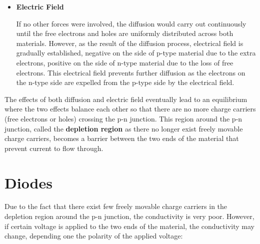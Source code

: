 \begin{itemize}
\begin{itemize}
\item {\bf Electric Field}

If no other forces were involved, the diffusion would carry out 
continuously until the free electrons and holes are uniformly distributed
across both materials. However, as the result of the diffusion process,
electrical field is gradually established, negative on the side of p-type 
material due to the extra electrons, positive on the side of n-type 
material due to the loss of free electrons. This electrical field prevents
further diffusion as the electrons on the n-type side are expelled from
the p-type side by the electrical field.

\end{itemize}

The effects of both diffusion and electric field eventually lead to an 
equilibrium where the two effects balance each other so that there are
no more charge carriers (free electrons or holes) crossing the p-n junction.
This region around the p-n junction, called the {\bf depletion region} as 
there no longer exist freely movable charge carriers, becomes a barrier 
between the two ends of the material that prevent current to flow through.


\end{itemize}

\section*{Diodes}

Due to the fact that there exist few freely movable charge carriers in the
depletion region around the p-n junction, the conductivity is very poor.
However, if certain voltage is applied to the two ends of the material, 
the conductivity may change, depending one the polarity of the applied
voltage:



